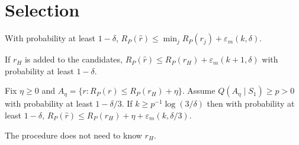\section{Selection}\label{sec:selection}

\begin{proposition}[Selection]\label{prop:selection}
With probability at least $1-\delta$, $R_P(\hat r)\le\min_j R_P(r_j)+\varepsilon_m(k,\delta)$.
\end{proposition}

\begin{corollary}\label{cor:human-in-pool}
If $r_H$ is added to the candidates, $R_P(\hat r)\le R_P(r_H)+\varepsilon_m(k+1,\delta)$ with probability at least $1-\delta$.
\end{corollary}

\begin{proposition}\label{prop:competitiveness}
Fix $\eta\ge0$ and $A_\eta=\{r:R_P(r)\le R_P(r_H)+\eta\}$.
Assume $Q(A_\eta\mid S_1)\ge p>0$ with probability at least $1-\delta/3$.
If $k\ge p^{-1}\log(3/\delta)$ then with probability at least $1-\delta$, $R_P(\hat r)\le R_P(r_H)+\eta+\varepsilon_m(k,\delta/3)$.
\end{proposition}

The procedure does not need to know $r_H$.
